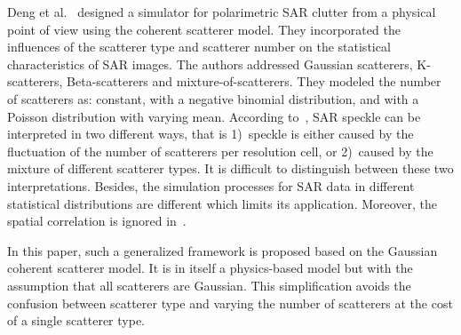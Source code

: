 \documentclass[journal]{IEEEtran}
\begin{document}
Deng et al.~\cite{Deng:RandomWalk2016} designed a simulator for polarimetric SAR clutter from a physical point of view using the coherent scatterer model.
They incorporated the influences of the scatterer type and scatterer number on the statistical characteristics of SAR images.
The authors addressed
Gaussian scatterers,
K-scatterers,
Beta-scatterers and
mixture-of-scatterers.
They modeled the number of scatterers as:
constant,
with a negative binomial distribution,
and with a Poisson distribution with varying mean.
According to~\cite{Deng:RandomWalk2016}, SAR speckle can be interpreted in two different ways, that is 1)~speckle is either caused by the fluctuation of the number of scatterers per resolution cell, or
2)~caused by the mixture of different scatterer types. It is difficult to distinguish between these two interpretations.
Besides, the simulation processes for SAR data in different statistical distributions are different which limits its application. Moreover, the spatial correlation is ignored in~\cite{Deng:RandomWalk2016}.


In this paper, such a generalized framework is proposed based on the Gaussian coherent scatterer model.
It is in itself a physics-based model but with the assumption that all scatterers are Gaussian.
This simplification avoids the confusion between scatterer type and varying the number of scatterers at the cost of a single scatterer type.
\end{document}
